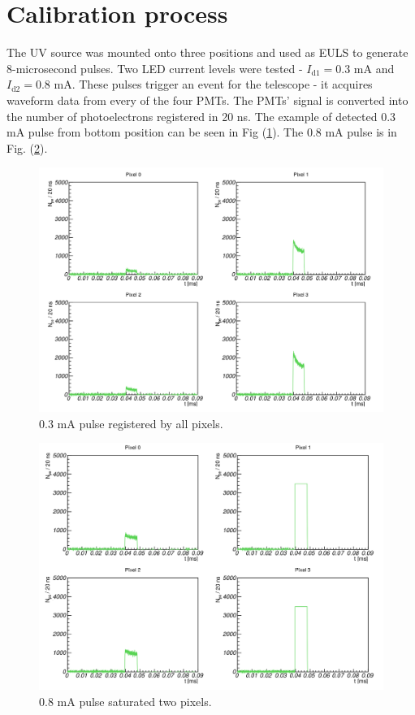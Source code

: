 \section{Calibration process}
The UV source was mounted onto three positions and used as EULS to generate 8-microsecond pulses. Two LED current levels were tested - $I_\textrm{d1} = 0.3$ mA and $I_\textrm{d2} = 0.8$ mA. These pulses trigger an event for the telescope - it acquires waveform data from every of the four PMTs. The PMTs' signal is converted into the number of photoelectrons registered in 20 ns. The example of detected 0.3 mA pulse from bottom position can be seen in Fig (\ref{03pulse}). The 0.8 mA pulse is in Fig. (\ref{08pulse}).

\begin{figure}[H]
 \centering
 \includegraphics[scale=0.42, angle = 0]{./pictures/CalibPulses.png}
 \caption{0.3 mA pulse registered by all pixels.}
 \label{03pulse}
 
\end{figure}

\begin{figure}[H]
 \centering
 \includegraphics[scale=0.42, angle = 0]{./pictures/CalibSaturated.png}
 \caption{0.8 mA pulse saturated two pixels.}
 \label{08pulse}
 
\end{figure}


